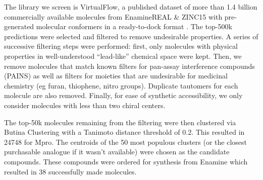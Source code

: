 The library we screen is VirtualFlow, a published dataset of more than 1.4 billion commercially available molecules from EnamineREAL \& ZINC15 with pre-generated molecular conformers in a ready-to-dock format \cite{Gorgulla2020VirtualFlow}. The top-500k predictions were selected and filtered to remove undesirable properties. A series of successive filtering steps were performed: first, only molecules with physical properties in well-understood ``lead-like'' chemical space \cite{ChemSpace} were kept. Then, we remove molecules that match known filters for pan-assay interference compounds (PAINS) \cite{Baell2010Pains} as well as filters for moieties that are undesirable for medicinal chemistry (eg furan, thiophene, nitro groups). Duplicate tautomers for each molecule are also removed. Finally, for ease of synthetic accessibility, we only consider molecules with less than two chiral centers.

The top-50k molecules remaining from the filtering were then clustered via Butina Clustering \cite{Butina1999Clustering} with a Tanimoto distance threshold of 0.2. This resulted in 24748 for Mpro. The centroids of the 50 most populous clusters (or the closest purchasable analogue if it wasn't available) were chosen as the candidate compounds. These compounds were ordered for synthesis from Enamine which resulted in 38 successfully made molecules.


